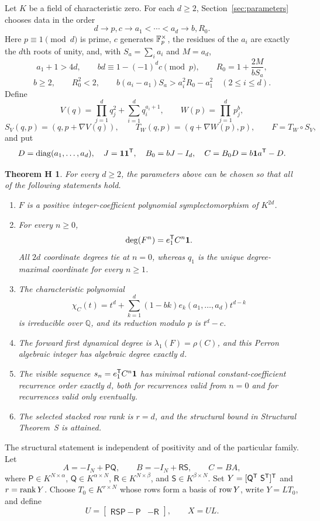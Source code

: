 \documentclass[11pt,letterpaper]{article}
\theoremstyle{plain}
\newtheorem*{theoremH}{Theorem H}
\begin{document}
Let $K$ be a field of characteristic zero.  For each $d\geq2$, Section~\ref{sec:parameters} chooses data in the order
\[
d\longrightarrow p,c\longrightarrow a_1<\cdots<a_d\longrightarrow b,R_0.
\]
Here $p\equiv1\pmod d$ is prime, $c$ generates $\mathbb{F}_{p}^\times$, the residues of the $a_i$ are exactly the $d$th roots of unity, and, with $S_a=\sum_i a_i$ and $M=a_d$,
\[
a_1+1>4d,\qquad bd\equiv1-(-1)^dc\pmod p,\qquad
R_0=1+\frac{2M}{bS_a},
\]
\[
b\geq2,\qquad R_0^2<2,\qquad
b(a_i-a_1)S_a>a_i^2R_0-a_1^2\quad(2\leq i\leq d).
\]
Define
\[
V(q)=\prod_{j=1}^d q_j^2+\sum_{i=1}^d q_i^{a_i+1},
\qquad W(p)=\prod_{j=1}^d p_j^b,
\]
\[
S_V(q,p)=(q,p+\nabla V(q)),\qquad
T_W(q,p)=(q+\nabla W(p),p),\qquad F=T_W\circ S_V,
\]
and put
\[
D=\operatorname{diag}(a_1,\ldots,a_d),\quad J=\mathbf{1}\mathbf{1}^{\mathsf{T}},\quad
B_0=bJ-I_d,\quad C=B_0D=b\mathbf{1} a^{\mathsf{T}}-D.
\]

\begin{theoremH}
For every $d\geq2$, the parameters above can be chosen so that all of the following statements hold.
\begin{enumerate}[label=\textup{(\roman*)}]
\item $F$ is a positive integer-coefficient polynomial symplectomorphism of $K^{2d}$.
\item For every $n\geq0$,
\[
\deg(F^n)=e_1^{\mathsf{T}}C^n\mathbf{1}.
\]
All $2d$ coordinate degrees tie at $n=0$, whereas $q_1$ is the unique degree-maximal coordinate for every $n\geq1$.
\item The characteristic polynomial
\[
\chi_C(t)=t^d+\sum_{k=1}^d(1-bk)e_k(a_1,\ldots,a_d)t^{d-k}
\]
is irreducible over $\mathbb Q$, and its reduction modulo $p$ is $t^d-c$.
\item The forward first dynamical degree is $\lambda_1(F)=\rho(C)$, and this Perron algebraic integer has algebraic degree exactly $d$.
\item The visible sequence $s_n=e_1^{\mathsf{T}}C^n\mathbf{1}$ has minimal rational constant-coefficient recurrence order exactly $d$, both for recurrences valid from $n=0$ and for recurrences valid only eventually.
\item The selected stacked row rank is $r=d$, and the structural bound in Structural Theorem~S is attained.
\end{enumerate}
\end{theoremH}

The structural statement is independent of positivity and of the particular family.  Let
\[
A=-I_N+\mathsf P\mathsf Q,\qquad
B=-I_N+\mathsf R\mathsf S,\qquad C=BA,
\]
where $\mathsf P\in K^{N\times\alpha}$, $\mathsf Q\in K^{\alpha\times N}$, $\mathsf R\in K^{N\times\beta}$, and $\mathsf S\in K^{\beta\times N}$.  Set $Y=[\mathsf Q^{\mathsf{T}}\ \mathsf S^{\mathsf{T}}]^{\mathsf{T}}$ and $r=\operatorname{rank} Y$.  Choose $T_0\in K^{r\times N}$ whose rows form a basis of $\operatorname{row} Y$, write $Y=LT_0$, and define
\[
U=\begin{bmatrix}\mathsf R\mathsf S\mathsf P-\mathsf P&-\mathsf R\end{bmatrix},
\qquad X=UL.
\]
\end{document}
